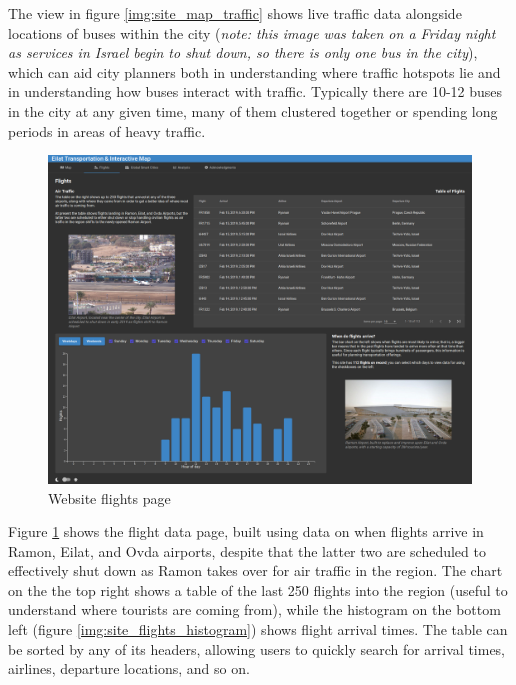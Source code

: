 \documentclass[12pt]{article}                               %
\begin{document}
The view in figure \ref{img:site_map_traffic} shows live traffic data alongside locations of buses within the city (\textit{note: this image was taken on a Friday night as services in Israel begin to shut down, so there is only one bus in the city}), which can aid city planners both in understanding where traffic hotspots lie and in understanding how buses interact with traffic. Typically there are 10-12 buses in the city at any given time, many of them clustered together or spending long periods in areas of heavy traffic.

\begin{figure}[H]
    \centering
    \includegraphics[width=1\columnwidth]{images/site_flights.png}
    \caption{Website flights page}
    \label{img:site_flights}
\end{figure}

Figure \ref{img:site_flights} shows the flight data page, built using data on when flights arrive in Ramon, Eilat, and Ovda airports, despite that the latter two are scheduled to effectively shut down as Ramon takes over for air traffic in the region. The chart on the the top right shows a table of the last 250 flights into the region (useful to understand where tourists are coming from), while the histogram on the bottom left (figure \ref{img:site_flights_histogram}) shows flight arrival times. The table can be sorted by any of its headers, allowing users to quickly search for arrival times, airlines, departure locations, and so on.
\end{document}
